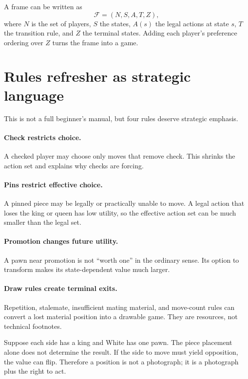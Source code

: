 \begin{formalbox}
A frame can be written as
\[
\mathcal{F}=(N,S,A,T,Z),
\]
where $N$ is the set of players, $S$ the states, $A(s)$ the legal actions at state $s$, $T$ the transition rule, and $Z$ the terminal states. Adding each player's preference ordering over $Z$ turns the frame into a game.
\end{formalbox}

\section{Rules refresher as strategic language}
This is not a full beginner's manual, but four rules deserve strategic emphasis.

\paragraph{Check restricts choice.} A checked player may choose only moves that remove check. This shrinks the action set and explains why checks are forcing.

\paragraph{Pins restrict effective choice.} A pinned piece may be legally or practically unable to move. A legal action that loses the king or queen has low utility, so the effective action set can be much smaller than the legal set.

\paragraph{Promotion changes future utility.} A pawn near promotion is not ``worth one'' in the ordinary sense. Its option to transform makes its state-dependent value much larger.

\paragraph{Draw rules create terminal exits.} Repetition, stalemate, insufficient mating material, and move-count rules can convert a lost material position into a drawable game. They are resources, not technical footnotes.

\begin{workedbox}[title={Worked example: side to move is part of the state}]
Suppose each side has a king and White has one pawn. The piece placement alone does not determine the result. If the side to move must yield opposition, the value can flip. Therefore a position is not a photograph; it is a photograph plus the right to act.
\end{workedbox}

